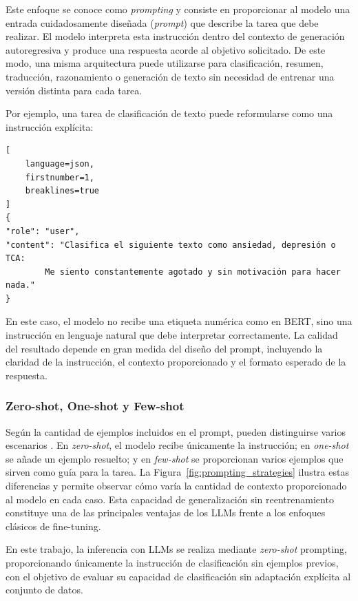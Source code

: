 Este enfoque se conoce como \textit{prompting} y consiste en proporcionar al modelo una entrada cuidadosamente diseñada (\textit{prompt}) que describe la tarea que debe realizar. El modelo interpreta esta instrucción dentro del contexto de generación autoregresiva y produce una respuesta acorde al objetivo solicitado. De este modo, una misma arquitectura puede utilizarse para clasificación, resumen, traducción, razonamiento o generación de texto sin necesidad de entrenar una versión distinta para cada tarea.

Por ejemplo, una tarea de clasificación de texto puede reformularse como una instrucción explícita:

\begin{lstlisting}[
	language=json,
	firstnumber=1,
	breaklines=true
]
{
"role": "user",
"content": "Clasifica el siguiente texto como ansiedad, depresión o TCA:
	    Me siento constantemente agotado y sin motivación para hacer nada."
}
\end{lstlisting}

En este caso, el modelo no recibe una etiqueta numérica como en \ac{BERT}, sino una instrucción en lenguaje natural que debe interpretar correctamente. La calidad del resultado depende en gran medida del diseño del prompt, incluyendo la claridad de la instrucción, el contexto proporcionado y el formato esperado de la respuesta.

\subsubsection{Zero-shot, One-shot y Few-shot}

Según la cantidad de ejemplos incluidos en el prompt, pueden distinguirse varios escenarios \cite{brown_language_2020}. En \textit{zero-shot}, el modelo recibe únicamente la instrucción; en \textit{one-shot} se añade un ejemplo resuelto; y en \textit{few-shot} se proporcionan varios ejemplos que sirven como guía para la tarea. La Figura~\ref{fig:prompting_strategies} ilustra estas diferencias y permite observar cómo varía la cantidad de contexto proporcionado al modelo en cada caso. Esta capacidad de generalización sin reentrenamiento constituye una de las principales ventajas de los \acp{LLM} frente a los enfoques clásicos de fine-tuning.

En este trabajo, la inferencia con \acp{LLM} se realiza mediante \textit{zero-shot} prompting, proporcionando únicamente la instrucción de clasificación sin ejemplos previos, con el objetivo de evaluar su capacidad de clasificación sin adaptación explícita al conjunto de datos.

